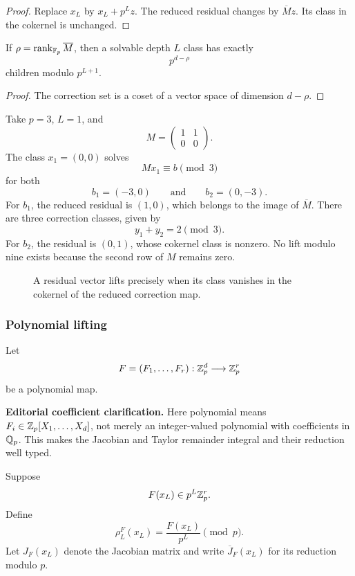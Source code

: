 \begin{proof}
Replace \(x_L\) by \(x_L+p^Lz\). The reduced residual changes by \(\overline Mz\). Its class in the cokernel is unchanged.
\end{proof}

\begin{histcorollary}\label{hist:cor:linear_child_count}
If \(\rho=\operatorname{rank}_{\mathbb F_p}\overline M\), then a solvable depth \(L\) class has exactly
\[
\boxed{
p^{d-\rho}
}
\]
children modulo \(p^{L+1}\).
\end{histcorollary}

\begin{proof}
The correction set is a coset of a vector space of dimension \(d-\rho\).
\end{proof}

\begin{histexample}\label{hist:ex:linear_lift_obstruction}
Take \(p=3\), \(L=1\), and
\[
M=
\begin{pmatrix}
1&1\\
0&0
\end{pmatrix}.
\]
The class \(x_1=(0,0)\) solves
\[
Mx_1\equiv b\pmod3
\]
for both
\[
b_1=(-3,0)
\qquad\text{and}\qquad
b_2=(0,-3).
\]
For \(b_1\), the reduced residual is \((1,0)\), which belongs to the image of \(\overline M\). There are three correction classes, given by
\[
y_1+y_2=2
\pmod3.
\]
For \(b_2\), the residual is \((0,1)\), whose cokernel class is nonzero. No lift modulo nine exists because the second row of \(M\) remains zero.
\end{histexample}

\begin{figure}[t]
\centering
{}
\caption{A residual vector lifts precisely when its class vanishes in the cokernel of the reduced correction map.}
\label{hist:fig:lift_obstruction}
\end{figure}

\subsubsection{Polynomial lifting}

Let
\[
F=(F_1,\ldots,F_r):\mathbb Z_p^d\longrightarrow\mathbb Z_p^r
\]
be a polynomial map.\par\noindent\textbf{Editorial coefficient clarification.} Here polynomial means $F_i\in\mathbb Z_p[X_1,\ldots,X_d]$, not merely an integer-valued polynomial with coefficients in $\mathbb Q_p$. This makes the Jacobian and Taylor remainder integral and their reduction well typed.\par Suppose
\[
F(x_L)\in p^L\mathbb Z_p^r.
\]
Define
\[
\rho_L^F(x_L)
=
\frac{F(x_L)}{p^L}
\pmod p.
\]
Let \(J_F(x_L)\) denote the Jacobian matrix and write \(\overline J_F(x_L)\) for its reduction modulo \(p\).

